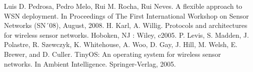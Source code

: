 \documentclass[11pt,a4]{article}
\begin{document}
\begin{multicols}{2}
\begin{thebibliography}{100}
 Luis D. Pedrosa, Pedro Melo, Rui M. Rocha, Rui Neves. A flexible approach to WSN deployment. In Proceedings of The First International Workshop on Sensor Networks (SN´08), August, 2008.
 H. Karl, A. Willig. Protocols and architectures for wireless sensor networks. Hoboken, NJ : Wiley, c2005.
 P. Levis, S. Madden, J. Polastre, R. Szewczyk, K. Whitehouse, A. Woo, D. Gay, J. Hill, M. Welsh, E. Brewer, and D. Culler. TinyOS: An operating system for wireless sensor networks. In Ambient Intelligence. Springer-Verlag, 2005.
\end{thebibliography}
\end{multicols}
\end{document}
